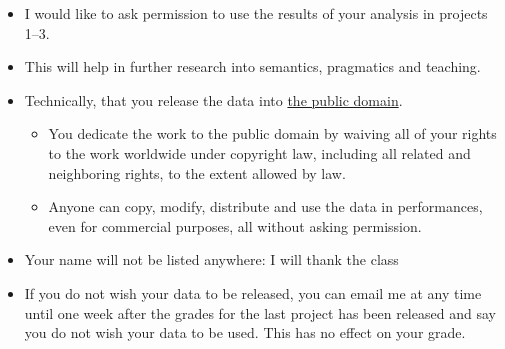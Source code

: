 \documentclass[a4paper,landscape,headrule,footrule,xetex]{foils}
\begin{document}

\begin{itemize}
\item I would like to ask permission to use the results of your
  analysis in projects 1--3.
\item This will help in further research into semantics, pragmatics
  and teaching.
\item Technically, that you release the data into \href{https://creativecommons.org/publicdomain/zero/1.0/}{the public domain}.
  \begin{itemize}
  \item You dedicate the work to the public domain by waiving all of
    your rights to the work worldwide under copyright law, including
    all related and neighboring rights, to the extent allowed by law.
  \item Anyone can copy, modify, distribute and use the data in
    performances, even for commercial purposes, all without asking
    permission.
  \end{itemize}
\item Your name will not be listed anywhere: I will thank the class
\item If you do not wish your data to be released, you can email me at
  any time until one week after the grades for the last project has
  been released and say you do not wish your data to be used.  This
  has no effect on your grade.
\end{itemize}






\small


\end{document}
